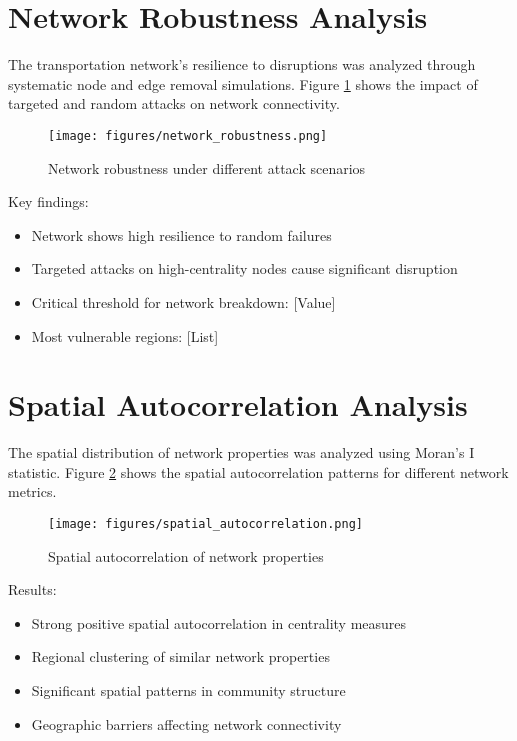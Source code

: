 \section{Network Robustness Analysis}
The transportation network's resilience to disruptions was analyzed through systematic node and edge removal simulations. Figure \ref{fig:robustness} shows the impact of targeted and random attacks on network connectivity.

\begin{figure}[H]
    \centering
    \texttt{[image: figures/network\_robustness.png]}
    \caption{Network robustness under different attack scenarios}
    \label{fig:robustness}
\end{figure}

Key findings:
\begin{itemize}
    \item Network shows high resilience to random failures
    \item Targeted attacks on high-centrality nodes cause significant disruption
    \item Critical threshold for network breakdown: [Value]
    \item Most vulnerable regions: [List]
\end{itemize}

\section{Spatial Autocorrelation Analysis}
The spatial distribution of network properties was analyzed using Moran's I statistic. Figure \ref{fig:spatial_autocorr} shows the spatial autocorrelation patterns for different network metrics.

\begin{figure}[H]
    \centering
    \texttt{[image: figures/spatial\_autocorrelation.png]}
    \caption{Spatial autocorrelation of network properties}
    \label{fig:spatial_autocorr}
\end{figure}

Results:
\begin{itemize}
    \item Strong positive spatial autocorrelation in centrality measures
    \item Regional clustering of similar network properties
    \item Significant spatial patterns in community structure
    \item Geographic barriers affecting network connectivity
\end{itemize}


